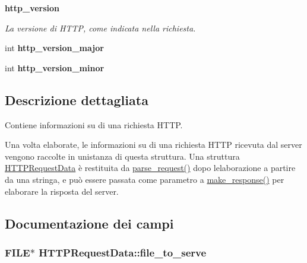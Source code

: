 \begin{Indent}{\bf http\+\_\+version}\par
{\em La versione di H\+T\+T\+P, come indicata nella richiesta. }\begin{DoxyCompactItemize}
\item 
\hypertarget{structHTTPRequestData_ae0ec4135e692b7a72a0c218f80fcbe79}{}int {\bfseries http\+\_\+version\+\_\+major}\label{structHTTPRequestData_ae0ec4135e692b7a72a0c218f80fcbe79}

\item 
\hypertarget{structHTTPRequestData_ac0ecb1c39ad0d090ba95a3f90d52b424}{}int {\bfseries http\+\_\+version\+\_\+minor}\label{structHTTPRequestData_ac0ecb1c39ad0d090ba95a3f90d52b424}

\end{DoxyCompactItemize}
\end{Indent}


\subsection{Descrizione dettagliata}
Contiene informazioni su di una richiesta H\+T\+T\+P. 

Una volta elaborate, le informazioni su di una richiesta H\+T\+T\+P ricevuta dal server vengono raccolte in un\textquotesingle{}istanza di questa struttura. Una struttura \hyperlink{structHTTPRequestData}{H\+T\+T\+P\+Request\+Data} è restituita da \hyperlink{parse__request_8h_a7f6b46b8f33ebe0426d0d13b320f2927}{parse\+\_\+request()} dopo l\textquotesingle{}elaborazione a partire da una stringa, e può essere passata come parametro a \hyperlink{make__response_8h_adccd9b35824054b0c445e09f0731d706}{make\+\_\+response()} per elaborare la risposta del server. 

\subsection{Documentazione dei campi}
\hypertarget{structHTTPRequestData_a52def24a4e2fefab7c723751b4ca5a7b}{}
\subsubsection[{file\+\_\+to\+\_\+serve}]{\setlength{\rightskip}{0pt plus 5cm}F\+I\+L\+E$\ast$ H\+T\+T\+P\+Request\+Data\+::file\+\_\+to\+\_\+serve}\label{structHTTPRequestData_a52def24a4e2fefab7c723751b4ca5a7b}


